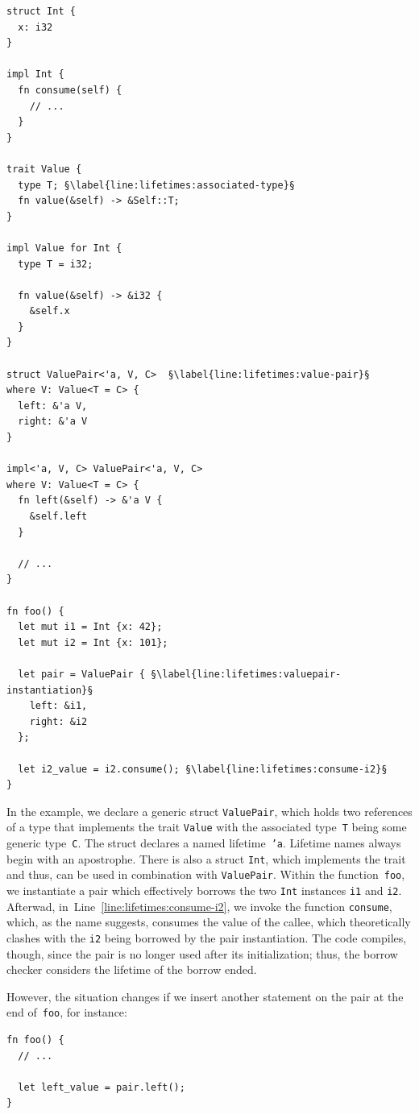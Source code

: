 \documentclass[paper=a4,%
  twoside,%
  BCOR4mm,%
  abstract=true,%
  toc=bibliography,%
  chapterprefix=true,%
  toc=bibliographynumbered,%
  open=right,%
  english,%
  pagesize=pdftex]{scrreprt}
\begin{document}
\begin{lstlisting}[style=boxed, caption={An example program that explicitly declares lifetimes}, label=lst:lifetime-example, escapechar=§]
struct Int {
  x: i32
}

impl Int {
  fn consume(self) {
    // ...
  }
}

trait Value {
  type T; §\label{line:lifetimes:associated-type}§
  fn value(&self) -> &Self::T;
}

impl Value for Int {
  type T = i32;

  fn value(&self) -> &i32 {
    &self.x
  }
}

struct ValuePair<'a, V, C>  §\label{line:lifetimes:value-pair}§
where V: Value<T = C> {
  left: &'a V,
  right: &'a V
}

impl<'a, V, C> ValuePair<'a, V, C>
where V: Value<T = C> {
  fn left(&self) -> &'a V {
    &self.left
  }

  // ...
}

fn foo() {
  let mut i1 = Int {x: 42};
  let mut i2 = Int {x: 101};

  let pair = ValuePair { §\label{line:lifetimes:valuepair-instantiation}§
    left: &i1,
    right: &i2
  };

  let i2_value = i2.consume(); §\label{line:lifetimes:consume-i2}§
}
\end{lstlisting}
In the example, we declare a generic struct \texttt{ValuePair}, which holds two references of a type that implements the trait \texttt{Value} with the associated type~\texttt{T} being some generic type~\texttt{C}. The struct declares a named lifetime~\texttt{'a}. Lifetime names always begin with an apostrophe. There is also a struct \texttt{Int}, which implements the trait and thus, can be used in combination with \texttt{ValuePair}. Within the function~\texttt{foo}, we instantiate a pair which effectively borrows the two \texttt{Int} instances \texttt{i1} and \texttt{i2}. Afterwad, in~Line~\ref{line:lifetimes:consume-i2}, we invoke the function \texttt{consume}, which, as the name suggests, consumes the value of the callee, which theoretically clashes with the \texttt{i2} being borrowed by the pair instantiation. The code compiles, though, since the pair is no longer used after its initialization; thus, the borrow checker considers the lifetime of the borrow ended.

However, the situation changes if we insert another statement on the pair at the end of~\texttt{foo}, for instance:

\begin{lstlisting}[style=boxed, caption={}, label=lst:lifetime-clash-example, escapechar=§]
fn foo() {
  // ...

  let left_value = pair.left();
}
\end{lstlisting}
\end{document}
